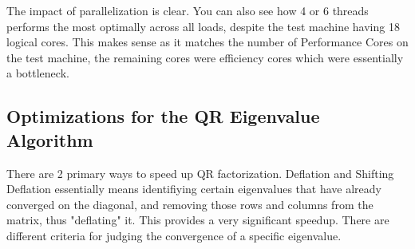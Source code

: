 \documentclass[12pt,a4paper]{article}
\begin{document}

\bigskip

The impact of parallelization is clear. You can also see how 4 or 6 threads performs the most optimally across all loads, despite the test machine having 18 logical cores. This makes sense as it matches the number of Performance Cores on the test machine, the remaining cores were efficiency cores which were essentially a bottleneck.

\subsection{Optimizations for the QR Eigenvalue Algorithm}

There are 2 primary ways to speed up QR factorization. Deflation and Shifting
\\

Deflation essentially means identifiying certain eigenvalues that have already converged on the diagonal, and removing those rows and columns from the matrix, thus "deflating" it. This provides a very significant speedup. There are different criteria for judging the convergence of a specific eigenvalue.
\\

\end{document}

